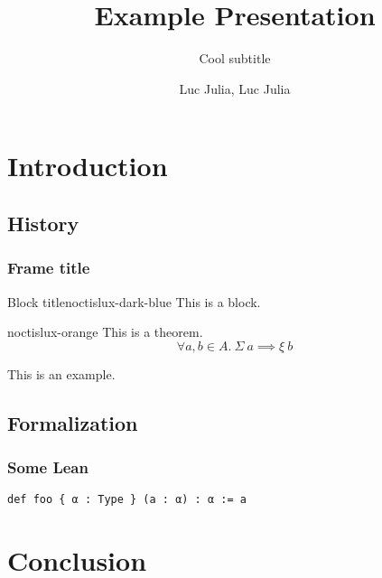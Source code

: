\documentclass[aspectratio=169]{beamer}
\title{Example Presentation}
\subtitle{Cool subtitle}
\author{Luc Julia, Luc Julia}
\institute{Université de Lorraine, CNRS, Inria, Loria, Nancy, France}
\begin{document}
\begin{frame}
  \maketitle
\end{frame}

\begin{frame}
  \tableofcontents
\end{frame}

\section{Introduction}

\subsection{History}

\begin{frame}
  \frametitle{Frame title}
  \begin{block}{Block title}{noctislux-dark-blue}
    This is a block.
  \end{block}
  \begin{theorem}{noctislux-orange}
    This is a theorem.
    \begin{equation}
      \forall a, b \in A.\ \Sigma\ a \implies \xi\ b
    \end{equation}
  \end{theorem}
  \begin{example}
    This is an example.
  \end{example}
\end{frame}

\subsection{Formalization}

\begin{frame}[fragile]
  \frametitle{Some Lean}
  \begin{lstlisting}[language=lean]
def foo { α : Type } (a : α) : α := a
  \end{lstlisting}
\end{frame}

\section{Conclusion}

\end{document}
